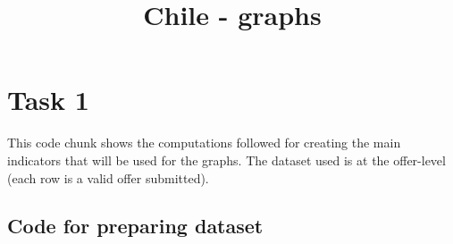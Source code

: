 \documentclass[
]{report}
\title{Chile - graphs}
\author{}
\date{}
\begin{document}
\maketitle
\ifdefined\Shaded\renewenvironment{Shaded}{\begin{tcolorbox}[sharp corners, frame hidden, interior hidden, boxrule=0pt, enhanced, breakable, borderline west={3pt}{0pt}{shadecolor}]}{\end{tcolorbox}}\fi

\hypertarget{task-1}{%
\chapter{Task 1}\label{task-1}}

This code chunk shows the computations followed for creating the main
indicators that will be used for the graphs. The dataset used is at the
offer-level (each row is a valid offer submitted).

\hypertarget{code-for-preparing-dataset}{%
\section{Code for preparing dataset}\label{code-for-preparing-dataset}}
\end{document}
